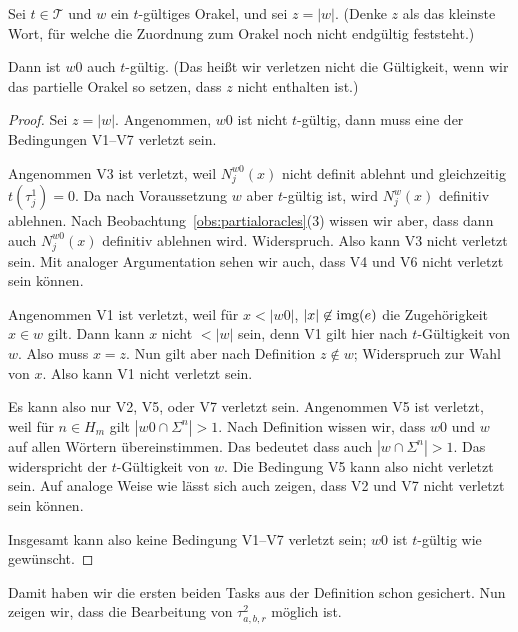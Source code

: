 \begin{lemma}\label{claim:myoracle-up-extension}
    Sei $t\in\mathcal T$ und $w$ ein $t$-gültiges Orakel, und sei $z=|w|$. 
    (Denke $z$ als das kleinste Wort, für welche die Zuordnung zum Orakel noch nicht endgültig feststeht.)

    Dann ist $w0$ auch $t$-gültig. (Das heißt wir verletzen nicht die Gültigkeit, wenn wir das partielle Orakel so setzen, dass $z$ nicht enthalten ist.)
\end{lemma}
\begin{proof}
    Sei $z=|w|$. 
    Angenommen, $w0$ ist nicht $t$-gültig, dann muss eine der Bedingungen V1--V7 verletzt sein.

    Angenommen V3 ist verletzt, weil $N_j^{w0}(x)$ nicht definit ablehnt und gleichzeitig $t(\tau_j^1)=0$. Da nach Voraussetzung $w$ aber $t$-gültig ist, wird $N_j^{w}(x)$ definitiv ablehnen.
    Nach Beobachtung~\ref{obs:partialoracles}(3) wissen wir aber, dass dann auch $N_j^{w0}(x)$ definitiv ablehnen wird. Widerspruch.
    Also kann V3 nicht verletzt sein. Mit analoger Argumentation sehen wir auch, dass V4 und V6 nicht verletzt sein können.

    Angenommen V1 ist verletzt, weil für $x<|w0|$, $|x|\not\in\operatorname{img}(e)$ die Zugehörigkeit $x\in w$ gilt. Dann kann $x$ nicht $<|w|$ sein, denn V1 gilt hier nach $t$-Gültigkeit von $w$. Also muss $x=z$.
    Nun gilt aber nach Definition $z\not\in w$; Widerspruch zur Wahl von $x$. Also kann V1 nicht verletzt sein.

    Es kann also nur V2, V5, oder V7 verletzt sein.
    Angenommen V5 ist verletzt, weil für $n\in H_m$ gilt $|w0\cap\Sigma^n|> 1$.
    Nach Definition wissen wir, dass $w0$ und $w$ auf allen Wörtern übereinstimmen.
    Das bedeutet dass auch $|w\cap\Sigma^n|>1$.
    Das widerspricht der $t$-Gültigkeit von $w$.
    Die Bedingung V5 kann also nicht verletzt sein.
    Auf analoge Weise wie lässt sich auch zeigen, dass V2 und V7 nicht verletzt sein können.

    Insgesamt kann also keine Bedingung V1--V7 verletzt sein; $w0$ ist $t$-gültig wie gewünscht.
\end{proof}

Damit haben wir die ersten beiden Tasks aus der Definition schon gesichert. Nun zeigen wir, dass die Bearbeitung von $\tau^2_{a,b,r}$ möglich ist.

